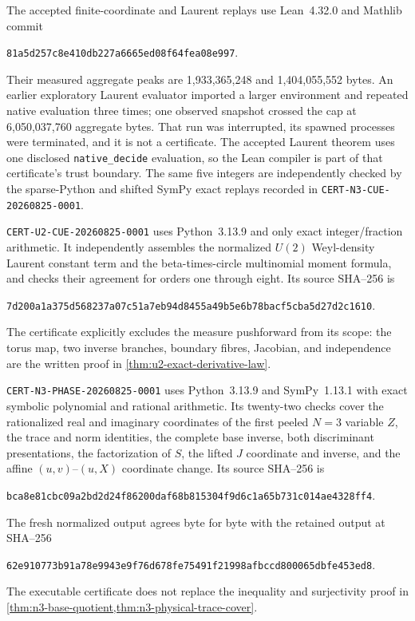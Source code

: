 The accepted finite-coordinate and Laurent replays use Lean~4.32.0 and Mathlib commit
\begin{center}\small\texttt{81a5d257c8e410db227a6665ed08f64fea08e997}.\end{center}
Their measured aggregate peaks are
1,933,365,248 and 1,404,055,552 bytes.  An earlier exploratory Laurent evaluator imported a
larger environment and repeated native evaluation three times; one observed snapshot crossed
the cap at 6,050,037,760 aggregate bytes.  That run was interrupted, its spawned processes were
terminated, and it is not a certificate.  The accepted Laurent theorem uses one disclosed
\texttt{native\_decide} evaluation, so the Lean compiler is part of that certificate's trust
boundary.  The same five integers are independently checked by the sparse-Python and shifted
SymPy exact replays recorded in \texttt{CERT-N3-CUE-20260825-0001}.

\texttt{CERT-U2-CUE-20260825-0001} uses Python~3.13.9 and only exact integer/fraction
arithmetic.  It independently assembles the normalized $U(2)$ Weyl-density Laurent constant
term and the beta-times-circle multinomial moment formula, and checks their agreement for
orders one through eight.  Its source SHA--256 is
\begin{center}\small\texttt{7d200a1a375d568237a07c51a7eb94d8455a49b5e6b78bacf5cba5d27d2c1610}.\end{center}
The certificate explicitly excludes the measure pushforward from its scope: the torus map,
two inverse branches, boundary fibres, Jacobian, and independence are the written proof in
\cref{thm:u2-exact-derivative-law}.

\texttt{CERT-N3-PHASE-20260825-0001} uses Python~3.13.9 and SymPy~1.13.1 with
exact symbolic polynomial and rational arithmetic.  Its twenty-two checks cover the
rationalized real and imaginary coordinates of the first peeled $N=3$ variable $Z$, the
trace and norm identities, the complete base inverse, both discriminant presentations, the
factorization of $S$, the lifted $J$ coordinate and inverse, and the affine $(u,v)$--$(u,X)$
coordinate change.  Its source SHA--256 is
\begin{center}\small\texttt{bca8e81cbc09a2bd2d24f86200daf68b815304f9d6c1a65b731c014ae4328ff4}.\end{center}
The fresh normalized output agrees byte for byte with the retained output at SHA--256
\begin{center}\small\texttt{62e910773b91a78e9943e9f76d678fe75491f21998afbccd800065dbfe453ed8}.\end{center}
The executable certificate does not replace the inequality and surjectivity proof in
\cref{thm:n3-base-quotient,thm:n3-physical-trace-cover}.

